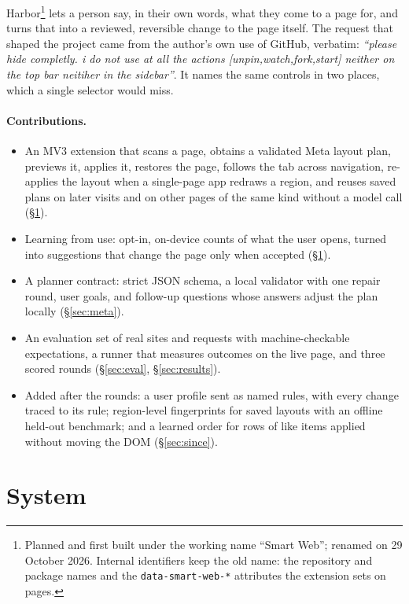 \documentclass[10pt,a4paper]{article}
\begin{document}
Harbor\footnote{Planned and first built under the working name ``Smart Web''; renamed on 29 October 2026. Internal identifiers keep the old name: the repository and package names and the \texttt{data-smart-web-*} attributes the extension sets on pages.} lets a person say, in their own words, what they come to a page for, and turns that into a reviewed, reversible change to the page itself. The request that shaped the project came from the author's own use of GitHub, verbatim: \emph{``please hide completly. i do not use at all the actions [unpin,watch,fork,start] neither on the top bar neitiher in the sidebar''}. It names the same controls in two places, which a single selector would miss.

\paragraph{Contributions.}
\begin{itemize}
\item An MV3 extension that scans a page, obtains a validated Meta layout plan, previews it, applies it, restores the page, follows the tab across navigation, re-applies the layout when a single-page app redraws a region, and reuses saved plans on later visits and on other pages of the same kind without a model call (\S\ref{sec:system}).
\item Learning from use: opt-in, on-device counts of what the user opens, turned into suggestions that change the page only when accepted (\S\ref{sec:system}).
\item A planner contract: strict JSON schema, a local validator with one repair round, user goals, and follow-up questions whose answers adjust the plan locally (\S\ref{sec:meta}).
\item An evaluation set of real sites and requests with machine-checkable expectations, a runner that measures outcomes on the live page, and three scored rounds (\S\ref{sec:eval}, \S\ref{sec:results}).
\item Added after the rounds: a user profile sent as named rules, with every change traced to its rule; region-level fingerprints for saved layouts with an offline held-out benchmark; and a learned order for rows of like items applied without moving the DOM (\S\ref{sec:since}).
\end{itemize}

\section{System}\label{sec:system}
\end{document}
